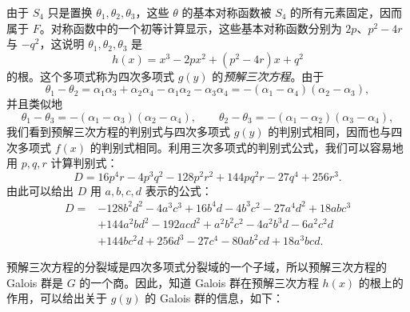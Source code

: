 由于 $S_4$ 只是置换 $\theta_1,\theta_2,\theta_3$，这些 $\theta$ 的基本对称函数被 $S_4$ 的所有元素固定，因而属于 $F$。对称函数中的一个初等计算显示，这些基本对称函数分别为 $2p$、$p^2-4r$ 与 $-q^2$，这说明 $\theta_1,\theta_2,\theta_3$ 是
\[
h(x)=x^3-2px^2+(p^2-4r)x+q^2
\]
的根。这个多项式称为四次多项式 $g(y)$ 的\emph{预解三次方程}。由于
\[
\theta_1-\theta_2=\alpha_1\alpha_3+\alpha_2\alpha_4-\alpha_1\alpha_2-\alpha_3\alpha_4
=-(\alpha_1-\alpha_4)(\alpha_2-\alpha_3),
\]
并且类似地
\[
\theta_1-\theta_3=-(\alpha_1-\alpha_3)(\alpha_2-\alpha_4),
\qquad
\theta_2-\theta_3=-(\alpha_1-\alpha_2)(\alpha_3-\alpha_4),
\]
我们看到预解三次方程的判别式与四次多项式 $g(y)$ 的判别式相同，因而也与四次多项式 $f(x)$ 的判别式相同。利用三次多项式的判别式公式，我们可以容易地用 $p,q,r$ 计算判别式：
\[
D=16p^4r-4p^3q^2-128p^2r^2+144pq^2r-27q^4+256r^3.
\]
由此可以给出 $D$ 用 $a,b,c,d$ 表示的公式：
\[
\begin{aligned}
D={}&-128b^2d^2-4a^3c^3+16b^4d-4b^3c^2-27a^4d^2+18abc^3\\
&+144a^2bd^2-192acd^2+a^2b^2c^2-4a^2b^3d-6a^2c^2d\\
&+144bc^2d+256d^3-27c^4-80ab^2cd+18a^3bcd.
\end{aligned}
\]

预解三次方程的分裂域是四次多项式分裂域的一个子域，所以预解三次方程的 Galois 群是 $G$ 的一个商。因此，知道 Galois 群在预解三次方程 $h(x)$ 的根上的作用，可以给出关于 $g(y)$ 的 Galois 群的信息，如下：

